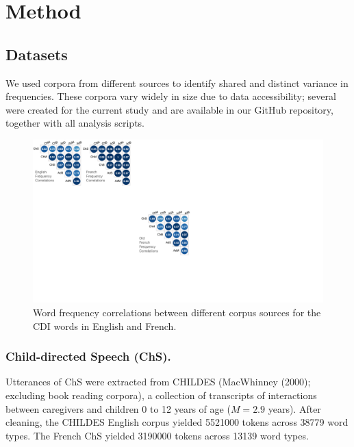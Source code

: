 \documentclass[10pt, letterpaper]{article}
\newenvironment{CodeChunk}{}{}
\begin{document}
\hypertarget{method}{%
\section{Method}\label{method}}

\hypertarget{datasets}{%
\subsection{Datasets}\label{datasets}}

We used corpora from different sources to identify shared and distinct
variance in frequencies. These corpora vary widely in size due to data
accessibility; several were created for the current study and are
available in our GitHub repository, together with all analysis scripts.

\begin{CodeChunk}
\begin{figure}[t]

{\centering \includegraphics[width=\linewidth]{figs/corpus_freq_cors_hor} 

}

\caption[Word frequency correlations between different corpus sources for the CDI words in English and French]{Word frequency correlations between different corpus sources for the CDI words in English and French.}\label{fig:fig1}
\end{figure}
\end{CodeChunk}

\hypertarget{child-directed-speech-chs.}{%
\subsubsection{Child-directed Speech
(ChS).}\label{child-directed-speech-chs.}}

Utterances of ChS were extracted from CHILDES (MacWhinney (2000);
excluding book reading corpora), a collection of transcripts of
interactions between caregivers and children 0 to 12 years of age
(\(M=2.9\) years). After cleaning, the CHILDES English corpus yielded
5521000 tokens across 38779 word types. The French ChS yielded 3190000
tokens across 13139 word types.
\end{document}
